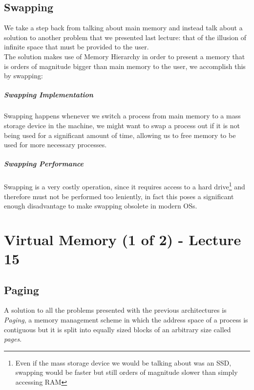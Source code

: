 \documentclass[openright, twoside]{report}
\theoremstyle{definition}
\theoremstyle{example}
\begin{document}
\section{Swapping}
	We take a step back from talking about main memory and instead talk about a 
	solution to another problem that we presented last lecture: that of the illusion 
	of infinite space that must be provided to the user.\\

	The solution makes use of Memory Hierarchy in order to present a memory that is 
	orders of magnitude bigger than main memory to the user, we accomplish this by 
	swapping:
	
	\paragraph{Swapping Implementation}
	
	Swapping happens whenever we switch a process from main memory to a mass storage 
	device in the machine, we might want to swap a process out if it is not being 
	used for a significant amount of time, allowing us to free memory to be used 
	for more necessary processes. 

	\paragraph{Swapping Performance}
	Swapping is a very costly operation, since it requires access to a hard drive\footnote{
		Even if the mass storage device we would be talking about was an SSD, swapping would be 
		faster but still orders of magnitude slower than simply accessing RAM
	}
	and therefore must not be performed too leniently, in fact this poses a significant 
	enough disadvantage to make swapping obsolete in modern OSs.

\chapter{Virtual Memory (1 of 2) - Lecture 15}
\section{Paging}

A solution to all the problems presented with the previous 
architectures is \emph{Paging}, a memory management scheme 
in which the address space of a process is contiguous but 
it is split into equally sized blocks of an arbitrary size 
called \emph{pages}.
\end{document}
